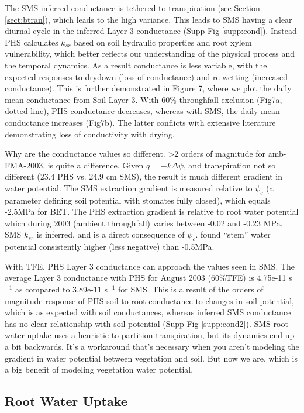 \documentclass[draft,linenumbers]{agujournal}
\begin{document}
The SMS inferred conductance is tethered to transpiration (see Section \ref{sect:btran}), which leads to the high variance.
This leads to SMS having a clear diurnal cycle in the inferred Layer 3 conductance (Supp Fig \ref{supp:cond}). 
Instead PHS calculates $k_{sr}$ based on soil hydraulic properties and root xylem vulnerability, 
which better reflects our understanding of the physical process and the temporal dynamics.
As a result conductance is less variable, with the expected responses to drydown (loss of conductance) and re-wetting (increased conductance).
This is further demonstrated in Figure 7, where we plot the daily mean conductance from Soil Layer 3.
With 60\% throughfall exclusion (Fig7a, dotted line), PHS conductance decreases, whereas with SMS, the daily mean conductance increases (Fig7b).
The latter conflicts with extensive literature demonstrating loss of conductivity with drying.

Why are the conductance values so different. >2 orders of magnitude for amb-FMA-2003, is quite a difference. 
Given $q=-k\Delta\psi$, and transpiration not so different (23.4 PHS vs. 24.9 cm SMS), the result is much different gradient in water potential.
The SMS extraction gradient is measured relative to $\psi_c$ (a parameter defining soil potential with stomates fully closed), which equals -2.5MPa for BET.
The PHS extraction gradient is relative to root water potential which during 2003 (ambient throughfall) varies between -0.02 and -0.23 MPa.
SMS $k_{sr}$ is inferred, and is a direct consequence of $\psi_c$.
\citet{fisher2006} found ``stem'' water potential consistently higher (less negative) than -0.5MPa.

With TFE, PHS Layer 3 conductance can approach the values seen in SMS. 
The average Layer 3 conductance with PHS for August 2003 (60\%TFE) is 4.75e-11 s$^{-1}$ as compared to 3.89e-11 s$^{-1}$ for SMS.
This is a result of the orders of magnitude response of PHS soil-to-root conductance to changes in soil potential, which is as expected with soil conductances,
whereas inferred SMS conductance has no clear relationship with soil potential (Supp Fig \ref{supp:cond2}). 
SMS root water uptake uses a heuristic to partition transpiration, but its dynamics end up a bit backwards. 
It's a workaround that's necessary when you aren't modeling the gradient in water potential between vegetation and soil. 
But now we are, which is a big benefit of modeling vegetation water potential.

\subsection{Root Water Uptake}
\label{sect:rwu}
\end{document}
